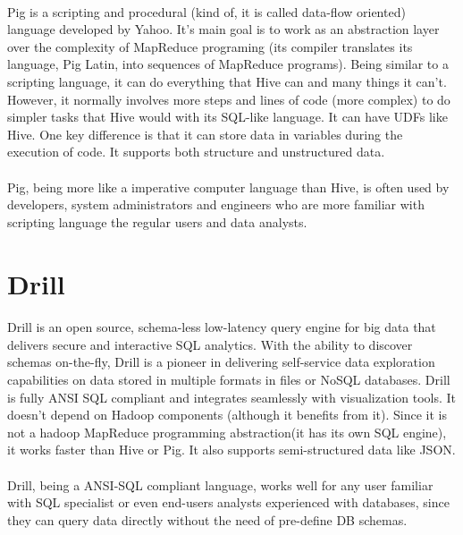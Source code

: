 \paragraph{}Pig is a scripting and procedural (kind of, it is called data-flow oriented) language developed by Yahoo. It's main goal is to work as an abstraction layer over the complexity of MapReduce programing (its compiler translates its language, Pig Latin, into sequences of MapReduce programs). Being similar to a scripting language, it can do everything that Hive can and many things it can't. However, it normally involves more steps and lines of code (more complex) to do simpler tasks that Hive would with its SQL-like language. It can have UDFs like Hive. One key difference is that it can store data in variables during the execution of code. It supports both structure and unstructured data.

\paragraph{}Pig, being more like a imperative computer language than Hive, is often used by developers, system administrators and engineers who are more familiar with scripting language the regular users and data analysts. 

\section{Drill}
\paragraph{}Drill is an open source, schema-less low-latency query engine for big data that delivers secure and interactive SQL analytics. With the ability to discover schemas on-the-fly, Drill is a pioneer in delivering self-service data exploration capabilities on data stored in multiple formats in files or NoSQL databases. Drill is fully ANSI SQL compliant and integrates seamlessly with visualization tools. It doesn't depend on Hadoop components (although it benefits from it). Since it is not a hadoop MapReduce programming abstraction(it has its own SQL engine), it works faster than Hive or Pig. It also supports semi-structured data like JSON.

\paragraph{}Drill, being a ANSI-SQL compliant language, works well for any user familiar with SQL specialist or even end-users analysts experienced with databases, since they can query data directly without the need of pre-define DB schemas. 

